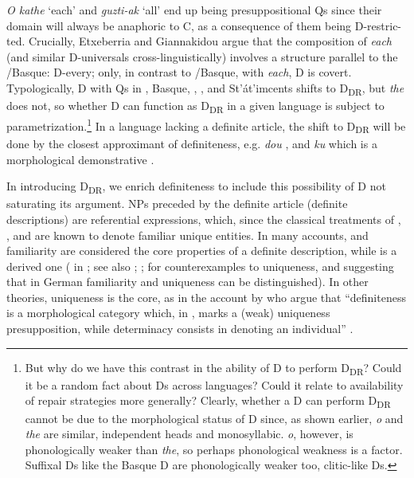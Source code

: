 \documentclass[output=paper,
modfonts
]{langscibook}
\begin{document}
\textit{O kathe} `each' and \textit{guzti-ak} `all' end up being presuppositional Qs since their domain will always be anaphoric to C, as a consequence of them being D-restric\hyp{}ted. Crucially, Etxeberria and Giannakidou argue that the composition of \textit{each} (and similar D-universals cross-linguistically) involves a structure parallel to the \fshyp{}Basque: {\ob}D-every{\cb}; only, in contrast to \fshyp{}Basque, with \textit{each}, D is covert. Typologically, D with Qs in , Basque, , , and St'\'at'imcents shifts to D\textsubscript{DR}, but  \textit{the} does not, so whether D can function as D\textsubscript{DR} in a given language is subject to parametrization.\footnote{But why do we have this contrast in the ability of D to perform D\textsubscript{DR}? Could it be a random fact about Ds across languages? Could it relate to availability of repair strategies more generally? Clearly, whether a D can perform D\textsubscript{DR} cannot be due to the morphological status of D since, as shown earlier,  \textit{o} and  \textit{the} are similar, independent heads and monosyllabic.  \textit{o}, however, is phonologically weaker than  \textit{the}, so perhaps phonological weakness is a factor. Suffixal Ds like the Basque D are phonologically weaker too, clitic-like Ds.} In a language lacking a definite article, the shift to D\textsubscript{DR} will be done by the closest approximant of definiteness, e.g.  \textit{dou} \citep{Cheng2009}, and  \textit{ku} which is a morphological demonstrative \citep{kang2015}. 

In introducing D\textsubscript{DR}, we enrich definiteness to include this possibility of D not saturating its argument. NPs preceded by the definite article (definite descriptions) are referential expressions, which, since the classical treatments of \citet{Russell1905}, \citet{strawson1952}, and \citet{Heim1982} are known to denote familiar unique entities. In many accounts,  and familiarity are considered the core properties of a definite description, while  is a derived one ( in \citealt{Roberts2003}; see also \citealt{WardBirner1995}; \citealt{elbourne2005}; \citealt{Ludlow2007} for counterexamples to uniqueness, and \citealt{Schwarz2009} suggesting that in German familiarity and uniqueness can be distinguished). In other theories, uniqueness is the core, as in the account by \citet{CoppockBeaver2015} who argue that ``definiteness is a morphological category which, in , marks a (weak) uniqueness presupposition, while determinacy consists in denoting an individual'' \citep[377]{CoppockBeaver2015}.
\end{document}
